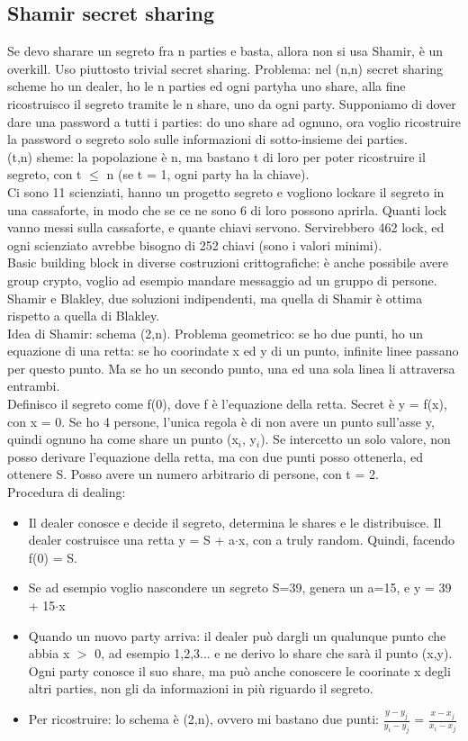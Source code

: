 \documentclass[16px]{article}
\begin{document}
\subsection{Shamir secret sharing}
Se devo sharare un segreto fra n parties e basta, allora non si usa Shamir, è un overkill. Uso piuttosto trivial secret sharing. Problema: nel (n,n) secret sharing scheme ho un dealer, ho le n parties ed ogni partyha uno share, alla fine ricostruisco il segreto tramite le n share, uno da ogni party. Supponiamo di dover dare una password a tutti i parties: do uno share ad ognuno, ora voglio ricostruire la password o segreto solo sulle informazioni di sotto-insieme dei parties.\\ (t,n) sheme: la popolazione è n, ma bastano t di loro per poter ricostruire il segreto, con t $\leq$ n (se t = 1, ogni party ha la chiave).\\ Ci sono 11 scienziati, hanno un progetto segreto e vogliono lockare il segreto in una cassaforte, in modo che se ce ne sono 6 di loro possono aprirla. Quanti lock vanno messi sulla cassaforte, e quante chiavi servono. Servirebbero 462 lock, ed ogni scienziato avrebbe bisogno di 252 chiavi (sono i valori minimi).\\ Basic building block in diverse costruzioni crittografiche: è anche possibile avere group crypto, voglio ad esempio mandare messaggio ad un gruppo di persone. Shamir e Blakley, due soluzioni indipendenti, ma quella di Shamir è ottima rispetto a quella di Blakley.\\ Idea di Shamir: schema (2,n). Problema geometrico: se ho due punti, ho un equazione di una retta: se ho coorindate x ed y di un punto, infinite linee passano per questo punto. Ma se ho un secondo punto, una ed una sola linea li attraversa entrambi.\\ Definisco il segreto come f(0), dove f è l'equazione della retta. Secret è y = f(x), con x = 0. Se ho 4 persone, l'unica regola è di non avere un punto sull'asse y, quindi ognuno ha come share un punto (x$_i$, y$_i$). Se intercetto un solo valore, non posso derivare l'equazione della retta, ma con due punti posso ottenerla, ed ottenere S. Posso avere un numero arbitrario di persone, con t = 2.\\ Procedura di dealing:
\begin{itemize}
\item Il dealer conosce e decide il segreto, determina le shares e le distribuisce. Il dealer costruisce una retta y = S + a$\cdot$x, con a truly random. Quindi, facendo f(0) = S.
\item Se ad esempio voglio nascondere un segreto S=39, genera un a=15, e y = 39 +  15$\cdot$x
\item Quando un nuovo party arriva: il dealer può dargli un qualunque punto che abbia x $>$ 0, ad esempio 1,2,3... e ne derivo lo share che sarà il punto (x,y).\\ Ogni party conosce il suo share, ma può anche conoscere le coorinate x degli altri parties, non gli da informazioni in più riguardo il segreto.
\item Per ricostruire: lo schema è (2,n), ovvero mi bastano due punti: $\frac{y-y_j}{y_i-y_j}$ = $\frac{x-x_j}{x_i-x_j}$
\end{itemize}
\end{document}
